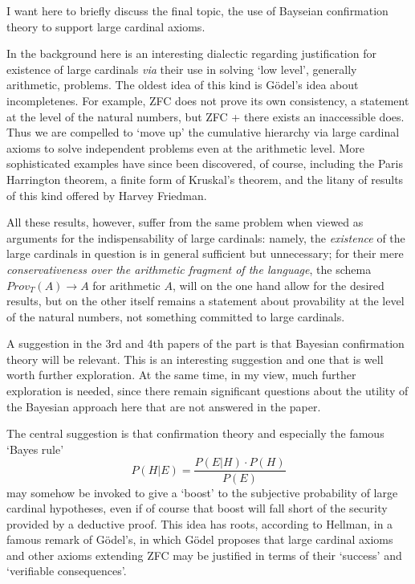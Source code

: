 \documentclass{asl}
\theoremstyle{definition}
\begin{document}
I want here to briefly discuss the final topic, the use of Bayseian confirmation theory to support large cardinal axioms.

In the background here is an interesting dialectic regarding justification for existence of large cardinals \emph{via} their use in solving `low level', generally arithmetic, problems. The oldest idea of this kind is G\"odel's idea about incompletenes. For example, ZFC does not prove its own consistency, a statement at the level of the natural numbers, but ZFC + there exists an inaccessible does. Thus we are compelled to `move up' the cumulative hierarchy via large cardinal axioms to solve independent problems even at the arithmetic level. More sophisticated examples have since been discovered, of course, including the Paris Harrington theorem, a finite form of Kruskal's theorem, and the litany of results of this kind offered by Harvey Friedman.

All these results, however, suffer from the same problem when viewed as arguments for the indispensability of large cardinals: namely, the \emph{existence} of the large cardinals in question is in general sufficient but unnecessary; for their mere \emph{conservativeness over the arithmetic fragment of the language}, the schema $Prov_T(A) \rightarrow A$ for arithmetic $A$, will on the one hand allow for the desired results, but on the other itself remains a statement about provability at the level of the natural numbers, not something committed to large cardinals.

A suggestion in the 3rd and 4th papers of the part is that Bayesian confirmation theory will be relevant. This is an interesting suggestion and one that is well worth further exploration. At the same time, in my view, much further exploration is needed, since there remain significant questions about the utility of the Bayesian approach here that are not answered in the paper.

The central suggestion is that confirmation theory and especially the famous `Bayes rule'
\begin{equation}
P(H|E) = \frac{P(E|H)\cdot P(H)}{P(E)}
\end{equation}
may somehow be invoked to give a `boost' to the subjective probability of large cardinal hypotheses, even if of course that boost will fall short of the security provided by a deductive proof. This idea has roots, according to Hellman, in a famous remark of G\"odel's, in which G\"odel proposes that large cardinal axioms and other axioms extending ZFC may be justified in terms of their `success' and `verifiable consequences'.
\end{document}
